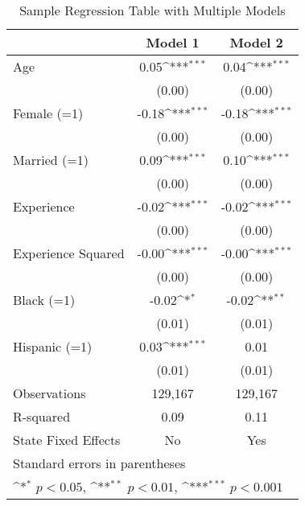 \begin{table}[htbp]\centering
\def\sym#1{\ifmmode^{#1}\else\(^{#1}\)\fi}
\caption{Sample Regression Table with Multiple Models \label{reg2}}
\begin{tabular}{l*{2}{c}}
\toprule
                    &\multicolumn{1}{c}{Model 1}&\multicolumn{1}{c}{Model 2}\\
\midrule
 Age                &        0.05\sym{***}&        0.04\sym{***}\\
                    &      (0.00)         &      (0.00)         \\
\addlinespace
Female (=1)         &       -0.18\sym{***}&       -0.18\sym{***}\\
                    &      (0.00)         &      (0.00)         \\
\addlinespace
 Married (=1)       &        0.09\sym{***}&        0.10\sym{***}\\
                    &      (0.00)         &      (0.00)         \\
\addlinespace
Experience          &       -0.02\sym{***}&       -0.02\sym{***}\\
                    &      (0.00)         &      (0.00)         \\
\addlinespace
Experience Squared  &       -0.00\sym{***}&       -0.00\sym{***}\\
                    &      (0.00)         &      (0.00)         \\
\addlinespace
 Black (=1)         &       -0.02\sym{*}  &       -0.02\sym{**} \\
                    &      (0.01)         &      (0.01)         \\
\addlinespace
 Hispanic (=1)      &        0.03\sym{***}&        0.01         \\
                    &      (0.01)         &      (0.01)         \\
\midrule
Observations        &     129,167         &     129,167         \\
R-squared           &        0.09         &        0.11         \\
State Fixed Effects &          No         &         Yes         \\
\bottomrule
\multicolumn{3}{l}{\footnotesize Standard errors in parentheses}\\
\multicolumn{3}{l}{\footnotesize \sym{*} \(p<0.05\), \sym{**} \(p<0.01\), \sym{***} \(p<0.001\)}\\
\end{tabular}
\end{table}
